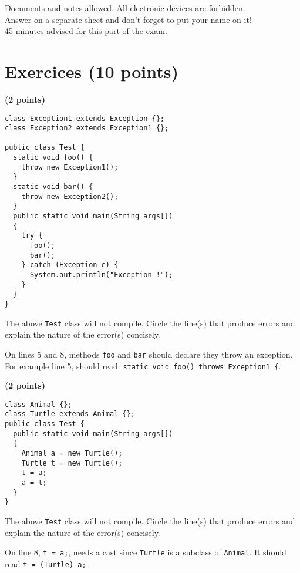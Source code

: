 \documentclass[]{exercices}
\begin{document}

\begin{center}
Documents and notes allowed. All electronic devices are forbidden.
\\Answer on a separate sheet and don't forget to put your name on it!
\\45 minutes advised for this part of the exam.
\end{center}

\section{Exercices (10 points)}

\begin{question} \textbf{(2 points)}
\begin{verbatim}
class Exception1 extends Exception {};
class Exception2 extends Exception1 {};

public class Test {
  static void foo() {
    throw new Exception1();
  }
  static void bar() {
    throw new Exception2();
  }
  public static void main(String args[])
  {
    try {
      foo();
      bar();
    } catch (Exception e) {
      System.out.println("Exception !");
    }
  }
}
\end{verbatim}

The above \verb!Test! class will not compile. Circle the line(s) that produce errors and
explain the nature of the error(s) concisely.
\begin{correction}
On lines 5 and 8, methods \verb!foo! and \verb!bar! should declare they
throw an exception. For example line 5, should read:
\verb!static void foo() throws Exception1 {!.
\end{correction}
\end{question}

\begin{question} \textbf{(2 points)}
\begin{verbatim}
class Animal {};
class Turtle extends Animal {};
public class Test {
  public static void main(String args[])
  {
    Animal a = new Turtle();
    Turtle t = new Turtle();
    t = a;
    a = t;
  }
}
\end{verbatim}

The above \verb!Test! class will not compile. Circle the line(s) that produce errors and
explain the nature of the error(s) concisely.
\begin{correction}
On line 8, \verb!t = a;!, needs a cast since \verb!Turtle! is a subclass of
\verb!Animal!. It should read \verb!t = (Turtle) a;!.
\end{correction}
\end{question}
\end{document}
